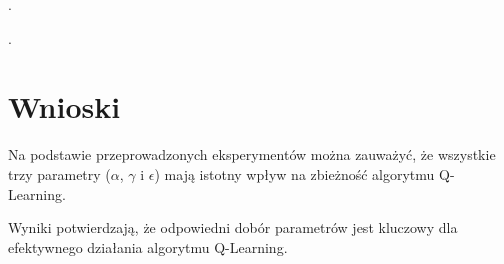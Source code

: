 \documentclass{article}
\begin{document}
\pagebreak
   
  .

\pagebreak

  .

\pagebreak

\section{Wnioski}
Na podstawie przeprowadzonych eksperymentów można zauważyć, że wszystkie trzy parametry ($\alpha$, $\gamma$ i $\epsilon$) mają istotny wpływ na zbieżność algorytmu Q-Learning. 


Wyniki potwierdzają, że odpowiedni dobór parametrów jest kluczowy dla efektywnego działania algorytmu Q-Learning.
 
\end{document}
